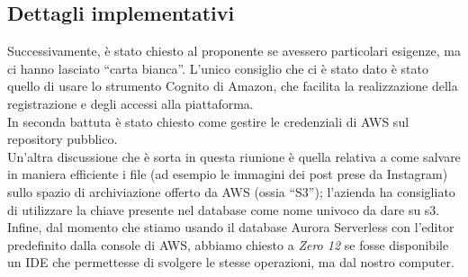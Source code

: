 \subsection{Dettagli implementativi}



Successivamente, è stato chiesto al proponente se avessero particolari esigenze, ma ci hanno lasciato “carta bianca”. L'unico consiglio che ci è stato dato è stato quello di usare lo strumento Cognito di Amazon, che facilita la realizzazione della registrazione e degli accessi alla piattaforma. \\

In seconda battuta è stato chiesto come gestire le credenziali di AWS sul repository pubblico. \\

Un'altra discussione che è sorta in questa riunione è quella relativa a come salvare in maniera efficiente i file (ad esempio le immagini dei post prese da Instagram) sullo spazio di archiviazione offerto da AWS (ossia “S3”); l'azienda ha consigliato di utilizzare la chiave presente nel database come nome univoco da dare su s3. \\

Infine, dal momento che stiamo usando il database Aurora Serverless con l'editor predefinito dalla console di AWS, abbiamo chiesto a \textit{Zero 12} se fosse disponibile un IDE che permettesse di svolgere le stesse operazioni, ma dal nostro computer.

\pagebreak
